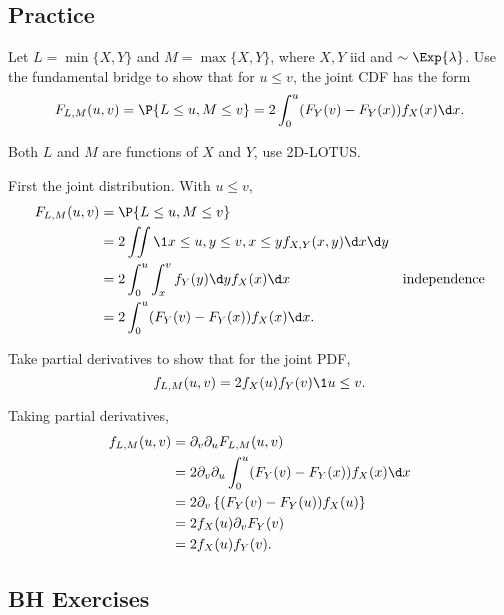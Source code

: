 \subsection{Practice}

\begin{exercise}
Let $L=\min\{X, Y\}$ and $M=\max\{X, Y\}$, where $X, Y$ iid and $\sim \Exp{\lambda}$.
Use the fundamental bridge to show that for $u\leq v$, the joint CDF has the form
\begin{equation*}
  F_{L,M}(u,v) = \P{L\leq u, M\leq v} = 2\int_0^u (F_Y(v)- F_Y(x)) f_X(x) \d x.
\end{equation*}
\begin{hint}
Both $L$ and $M$ are functions of $X$ and $Y$, use 2D-LOTUS.
\end{hint}
\begin{solution}
First the joint distribution. With $u\leq v$,
  \begin{align*}
F_{L,M}(u,v) &= \P{L\leq u, M \leq v} \\
&= 2\iint \1{x \leq u, y\leq v, x\leq y} f_{X,Y}(x,y)\d x \d y \\
&= 2\int_0^u \int_x^v f_Y(y) \d y f_X(x) \d x & \text{independence} \\
&= 2\int_0^u (F_Y(v)- F_Y(x)) f_X(x) \d x.
  \end{align*}
\end{solution}
\end{exercise}


\begin{exercise}\label{ex:25}
Take partial derivatives to show that for the joint PDF,
\begin{equation*}
f_{L,M}(u,v) = 2f_X(u) f_Y(v)\1{u\leq v}.
\end{equation*}
\begin{solution}
Taking partial derivatives,
\begin{align*}
f_{L,M}(u,v)
&=\partial_v\partial_{u}F_{L,M}(u,v) \\
&=2 \partial_v\partial_{u} \int_0^u (F_Y(v)- F_Y(x)) f_X(x) \d x  \\
&=2 \partial_v \left\{(F_Y(v)- F_Y(u)) f_X(u) \right \}  \\
&=2 f_X(u)\partial_v F_Y(v)  \\
&=2 f_X(u)f_Y(v).
\end{align*}
\end{solution}
\end{exercise}


\subsection{BH Exercises}


